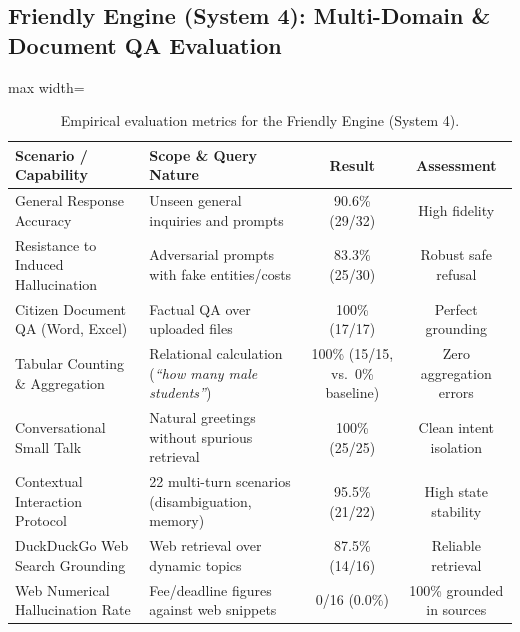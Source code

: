 \documentclass[11pt,a4paper]{article}
\begin{document}
\subsection{Friendly Engine (System 4): Multi-Domain \& Document QA Evaluation}
\begin{table}[htbp]
\centering
\caption{Empirical evaluation metrics for the Friendly Engine (System 4).}
\label{tab:friendly}
\small
\begin{adjustbox}{max width=\textwidth}
\begin{tabular}{@{}p{4.6cm}p{5.4cm}cc@{}}
\toprule
\textbf{Scenario / Capability} & \textbf{Scope \& Query Nature} & \textbf{Result} & \textbf{Assessment}\\
\midrule
General Response Accuracy & Unseen general inquiries and prompts & 90.6\% (29/32) & High fidelity\\
Resistance to Induced Hallucination & Adversarial prompts with fake entities/costs & 83.3\% (25/30) &
Robust safe refusal\\
Citizen Document QA (Word, Excel) & Factual QA over uploaded files & 100\% (17/17) & Perfect grounding\\
Tabular Counting \& Aggregation & Relational calculation (\emph{``how many male students''}) & 100\%
(15/15, vs.\ 0\% baseline) & Zero aggregation errors\\
Conversational Small Talk & Natural greetings without spurious retrieval & 100\% (25/25) & Clean intent
isolation\\
Contextual Interaction Protocol & 22 multi-turn scenarios (disambiguation, memory) & 95.5\% (21/22) &
High state stability\\
DuckDuckGo Web Search Grounding & Web retrieval over dynamic topics & 87.5\% (14/16) & Reliable retrieval\\
Web Numerical Hallucination Rate & Fee/deadline figures against web snippets & 0/16 (0.0\%) & 100\%
grounded in sources\\
\bottomrule
\end{tabular}
\end{adjustbox}
\end{table}
\end{document}
